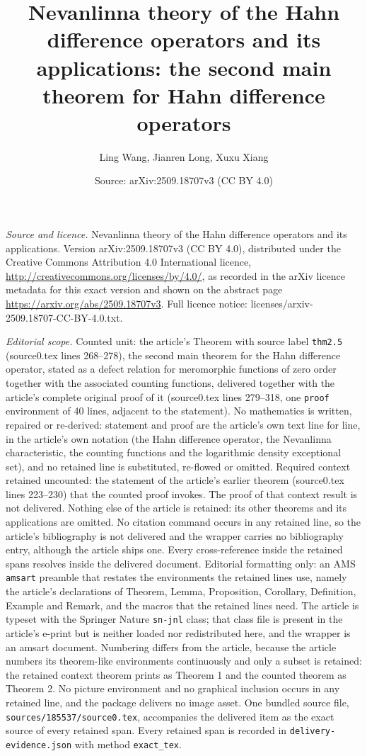 \documentclass[10pt,a4paper]{amsart}
\title[Nevanlinna theory of Hahn difference operators]{Nevanlinna theory of the Hahn difference operators and its applications: the second main theorem for Hahn difference operators}
\author{Ling Wang, Jianren Long, Xuxu Xiang}
\date{Source: arXiv:2509.18707v3 (CC BY 4.0)}
\theoremstyle{plain}
\theoremstyle{definition}
\theoremstyle{remark}
\begin{document}
\maketitle
\noindent\emph{Source and licence.} Nevanlinna theory of the Hahn difference operators and its applications. Version arXiv:2509.18707v3 (CC BY 4.0), distributed under the Creative Commons Attribution 4.0 International licence, \url{http://creativecommons.org/licenses/by/4.0/}, as recorded in the arXiv licence metadata for this exact version and shown on the abstract page \url{https://arxiv.org/abs/2509.18707v3}. Full licence notice: licenses/arxiv-2509.18707-CC-BY-4.0.txt.\par\smallskip

\noindent\textit{Editorial scope.} Counted unit: the article's Theorem with source label \texttt{thm2.5} (source0.tex lines 268--278), the second main theorem for the Hahn difference operator, stated as a defect relation for meromorphic functions of zero order together with the associated counting functions, delivered together with the article's complete original proof of it (source0.tex lines 279--318, one \texttt{proof} environment of 40 lines, adjacent to the statement). No mathematics is written, repaired or re-derived: statement and proof are the article's own text line for line, in the article's own notation (the Hahn difference operator, the Nevanlinna characteristic, the counting functions and the logarithmic density exceptional set), and no retained line is substituted, re-flowed or omitted. Required context retained uncounted: the statement of the article's earlier theorem (source0.tex lines 223--230) that the counted proof invokes. The proof of that context result is not delivered. Nothing else of the article is retained: its other theorems and its applications are omitted. No citation command occurs in any retained line, so the article's bibliography is not delivered and the wrapper carries no bibliography entry, although the article ships one. Every cross-reference inside the retained spans resolves inside the delivered document. Editorial formatting only: an AMS \texttt{amsart} preamble that restates the environments the retained lines use, namely the article's declarations of Theorem, Lemma, Proposition, Corollary, Definition, Example and Remark, and the macros that the retained lines need. The article is typeset with the Springer Nature \texttt{sn-jnl} class; that class file is present in the article's e-print but is neither loaded nor redistributed here, and the wrapper is an amsart document. Numbering differs from the article, because the article numbers its theorem-like environments continuously and only a subset is retained: the retained context theorem prints as Theorem 1 and the counted theorem as Theorem 2. No picture environment and no graphical inclusion occurs in any retained line, and the package delivers no image asset. One bundled source file, \texttt{sources/185537/source0.tex}, accompanies the delivered item as the exact source of every retained span. Every retained span is recorded in \texttt{delivery-evidence.json} with method \texttt{exact\_tex}.
\end{document}
